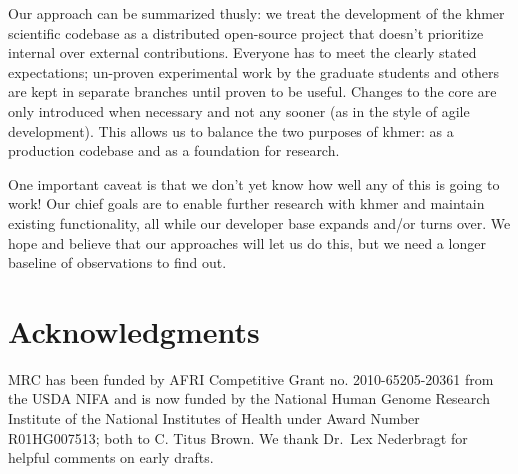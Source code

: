 \documentclass[12pt]{article}
\begin{document}
Our approach can be summarized thusly: we treat the development of the khmer
scientific codebase as a distributed open-source project that doesn't
prioritize internal over external contributions. Everyone has to meet the
clearly stated expectations; un-proven experimental work by the graduate
students and others are kept in separate branches until proven to be useful.
Changes to the core are only introduced when necessary and not any sooner (as
in the style of agile development). This allows us to balance the two purposes
of khmer: as a production codebase and as a foundation for research.

One important caveat is that we don't yet know how well any of this is
going to work!  Our chief goals are to enable further research with
khmer and maintain existing functionality, all while our
developer base expands and/or turns over. We hope and believe that our
approaches will let us do this, but we need a longer baseline of
observations to find out.


\section*{Acknowledgments}

MRC has been funded by AFRI Competitive Grant no. 2010-65205-20361
from the USDA NIFA and is now funded by the National Human Genome
Research Institute of the National Institutes of Health under Award
Number R01HG007513; both to C. Titus Brown.  We thank Dr.\ Lex
Nederbragt for helpful comments on early drafts.







\end{document}

